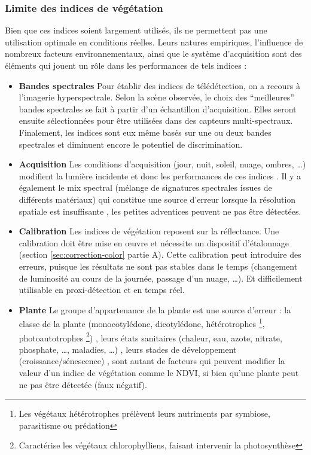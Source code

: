 \documentclass[../thesis.tex]{subfiles}
\begin{document}
    \subsubsection{Limite des indices de végétation} Bien que ces indices soient largement utilisés, ils ne permettent pas une utilisation optimale en conditions réelles. Leurs natures empiriques, l'influence de nombreux facteurs environnementaux, ainsi que le système d'acquisition sont des éléments qui jouent un rôle dans les performances de tels indices :
    \\
    \noindent
    \begin{itemize}
        \item \textbf{Bandes spectrales} Pour établir des indices de télédétection, on a recours à l'imagerie hyperspectrale. Selon la scène observée, le choix des ``meilleures'' bandes spectrales se fait à partir d'un échantillon d'acquisition. Elles seront ensuite sélectionnées pour être utilisées dans des capteurs multi-spectraux. Finalement, les indices sont eux même basés sur une ou deux bandes spectrales et diminuent encore le potentiel de discrimination.
        
        \item \textbf{Acquisition} Les conditions d'acquisition (jour, nuit, soleil, nuage, ombres, \dots) modifient la lumière incidente et donc les performances de ces indices \cite{Zhang2015}. Il y a également le mix spectral (mélange de signatures spectrales issues de différents matériaux) qui constitue une source d'erreur lorsque la résolution spatiale est insuffisante \cite{Louargant2017}, les petites adventices peuvent ne pas être détectées.
        
        \item \textbf{Calibration} Les indices de végétation reposent sur la réflectance. Une calibration doit être mise en œuvre et nécessite un dispositif d'étalonnage (section \ref{sec:correction-color} partie A). Cette calibration peut introduire des erreurs, puisque les résultats ne sont pas stables dans le temps (changement de luminosité au cours de la journée, passage d'un nuage, \dots). Et difficilement utilisable en proxi-détection et en temps réel.
        
        \item \textbf{Plante} Le groupe d'appartenance de la plante est une source d'erreur : la classe de la plante (monocotylédone, dicotylédone, hétérotrophes \footnote{Les végétaux hétérotrophes prélèvent leurs nutriments par symbiose, parasitisme ou prédation}, photoautotrophes \footnote{Caractérise les végétaux chlorophylliens, faisant intervenir la photosynthèse}) \cite{WANG2019154}, leurs états sanitaires \cite{gay2003elaboration, alnaser:tel-01914978, fournier:pastel-00794011} (chaleur, eau, azote, nitrate, phosphate, \dots, maladies, \dots) \cite{PIEDALLU20192874}, leurs stades de développement (croissance/sénescence) \cite{Palanisamy2019}, sont autant de facteurs qui peuvent modifier la valeur d'un indice de végétation comme le NDVI, si bien qu'une plante peut ne pas être détectée (faux négatif).
        

\end{itemize}
\end{document}
